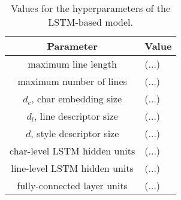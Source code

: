 \label{chap:evaluation}

\begin{table}[htbp]
	\centering
	\begin{tabular}{c|l}
		\hline
		\textbf{Parameter}           & \multicolumn{1}{c}{\textbf{Value}} \\ \hline
		maximum line length   & (...)                            \\ \hline
		maximum number of lines   & (...)                            \\ \hline
		$d_c$, char embedding size   & (...)                            \\ \hline
		$d_l$, line descriptor size  & (...)                            \\ \hline
		$d$, style descriptor size & (...)                            \\ \hline
		char-level LSTM hidden units & (...)                            \\ \hline
		line-level LSTM hidden units & (...)                            \\ \hline
		fully-connected layer units  & (...)                            \\ \hline
	\end{tabular}
	\caption{Values for the hyperparameters of the LSTM-based model.}
	\label{tab:lstm_hyper}
\end{table}
